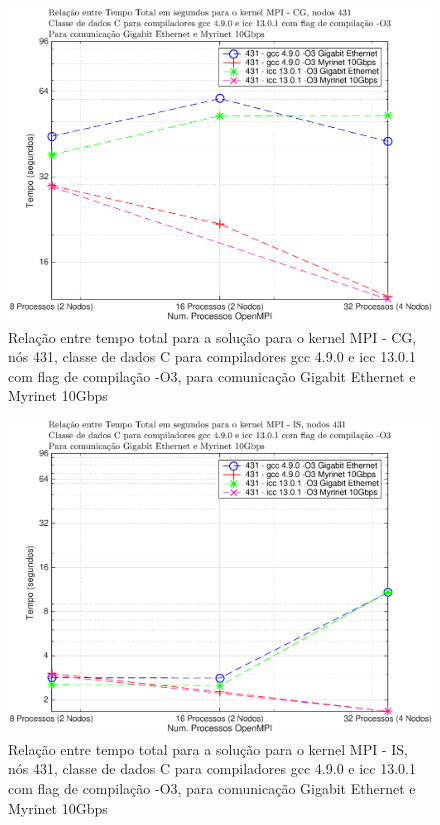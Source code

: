 \documentclass[conference,compsoc]{IEEEtran}
\begin{document}
\begin{figure}[H]
\centering
\includegraphics[width=1.1\columnwidth]{EPS/MPI/431/mpi_431_cg.eps}
\caption{Relação entre tempo total para a solução para o kernel MPI - CG, nós 431, classe de dados C para compiladores gcc 4.9.0 e icc 13.0.1 com flag de compilação  -O3, para comunicação Gigabit Ethernet e Myrinet 10Gbps}
\label{tempo_mpi_cg_431}
\end{figure}

\begin{figure}[H]
\centering
\includegraphics[width=1.1\columnwidth]{EPS/MPI/431/mpi_431_is.eps}
\caption{Relação entre tempo total para a solução para o kernel MPI - IS, nós 431, classe de dados C para compiladores gcc 4.9.0 e icc 13.0.1 com flag de compilação  -O3, para comunicação Gigabit Ethernet e Myrinet 10Gbps}
\label{tempo_mpi_is_431}
\end{figure}
\end{document}
